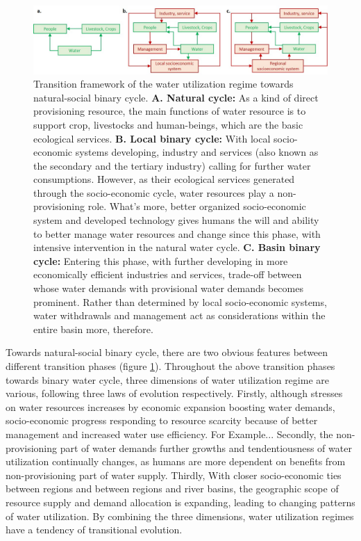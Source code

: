 \documentclass[9pt, twocolumn, twoside, lineno]{pnas-new}
\begin{document}
\begin{figure}%
	\centering
	\includegraphics[width=\linewidth]{../../figures/main_text/framework}
	\caption{
		Transition framework of the water utilization regime towards natural-social binary cycle.
		\textbf{A. Natural cycle:} As a kind of direct provisioning resource, the main functions of water resource is to support crop, livestocks and human-beings, which are the basic ecological services.
		\textbf{B. Local binary cycle:} With local socio-economic systems developing, industry and services (also known as the secondary and the tertiary industry) calling for further water consumptions.
		However, as their ecological services generated through the socio-economic cycle, water resources play a non-provisioning role. What's more, better organized socio-economic system and developed technology gives humans the will and ability to better manage water resources and change since this phase, with intensive intervention in the natural water cycle. 
		\textbf{C. Basin binary cycle:} Entering this phase, with further developing in more economically efficient industries and services, trade-off between whose water demands with provisional water demands becomes prominent. Rather than determined by local socio-economic systems, water withdrawals and management act as considerations within the entire basin more, therefore. 
	}
	\label{fig:framework}
\end{figure}


Towards natural-social binary cycle, there are two obvious features between different transition phases  (figure \ref{fig:framework}).
Throughout the above transition phases towards binary water cycle, 
three dimensions of water utilization regime are various, following three laws of evolution respectively.
Firstly, although stresses on water resources increases by economic expansion boosting water demands, 
socio-economic progress responding to resource scarcity because of better management and increased water use efficiency. 
For Example...
Secondly, the non-provisioning part of water demands further growths and 
tendentiousness of water utilization continually changes, 
as humans are more dependent on benefits from non-provisioning part of water supply.
Thirdly, With closer socio-economic ties between regions and between regions and river basins, 
the geographic scope of resource supply and demand allocation is expanding, 
leading to changing patterns of water utilization.
By combining the three dimensions, water utilization regimes have a tendency of transitional evolution.
\end{document}
